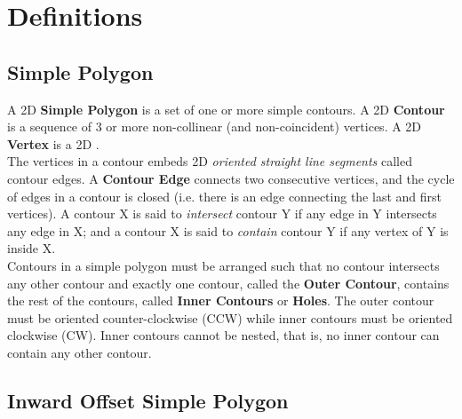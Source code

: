 
\section{Definitions}

\subsection{Simple Polygon}

A 2D \textbf{Simple Polygon} is a set of one or more simple contours. A 2D \textbf{Contour} is a sequence of 3 or more non-collinear (and non-coincident) vertices. A 2D \textbf{Vertex} is a 2D .\\
The vertices in a contour embeds 2D \textit{oriented straight line segments} called contour edges. A \textbf{Contour Edge} connects two consecutive vertices, and the cycle of edges in a contour is closed (i.e. there is an edge connecting the last and first vertices). A contour X is said to \textit{intersect} contour Y if any edge in Y intersects any edge in X; and a contour X is said to \textit{contain} contour Y if any vertex of Y is inside X.\\
Contours in a simple polygon must be arranged such that no contour intersects any other contour and exactly one contour, called the \textbf{Outer Contour}, contains the rest of the contours, called \textbf{Inner Contours} or \textbf{Holes}. The outer contour must be oriented counter-clockwise (CCW) while inner contours must be oriented clockwise (CW). Inner contours cannot be nested, that is, no inner contour can contain any other contour.

\subsection{Inward Offset Simple Polygon}

